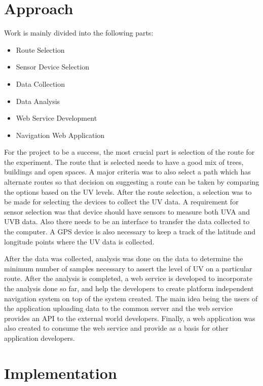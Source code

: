 \documentclass[12pt,fullpage,doublespace]{article}
\begin{document}
\newpage
\section{Approach}
Work is mainly divided into the following parts:
\begin{itemize}
\item{Route Selection}
\item{Sensor Device Selection}
\item{Data Collection}
\item{Data Analysis}
\item{Web Service Development}
\item{Navigation Web Application}
\end{itemize}
For the project to be a success, the most crucial part is selection of the route for the experiment. The route that is selected needs to have a good mix of trees, buildings and open spaces. A major criteria was to also select a path which has alternate routes so that decision on suggesting a route can be taken by comparing the options based on the UV levels. After the route selection, a selection was to be made for selecting the devices to collect the UV data. A requirement for sensor selection was that device should have sensors to measure both UVA and UVB data. Also there needs to be an interface to transfer the data collected to the computer.  A GPS device is also necessary to keep a track of the latitude and longitude points where the UV data is collected.  

After the data was collected, analysis was done on the data to determine the minimum number of samples necessary to assert the level of UV on a particular route. After the analysis is completed, a web service is developed to incorporate the analysis done so far, and help the developers to create platform independent navigation system on top of the system created. The main idea being the users of the application uploading data to the common server and the web service provides an API to the external world developers. Finally, a web application was also created to consume the web service and provide as a basis for other application developers. 
\newpage
\section{Implementation}
\end{document}

